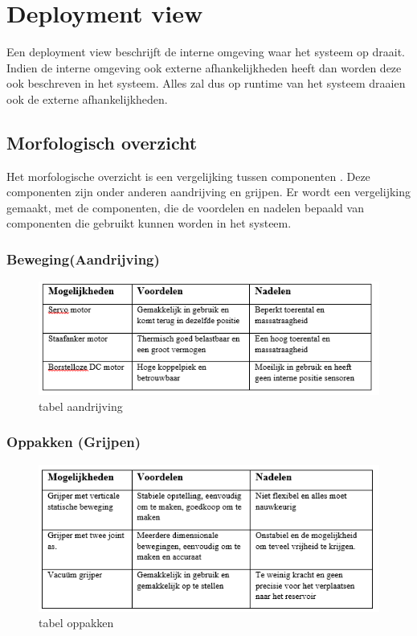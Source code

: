 \documentclass[12pt]{article} %
\begin{document}
\newpage%
\section{Deployment view}
\label{sec:Deployment view}
Een deployment view beschrijft de interne omgeving waar het systeem op draait. Indien de interne omgeving ook externe afhankelijkheden heeft dan worden deze ook beschreven in het systeem. Alles zal dus op runtime van het systeem draaien ook de externe afhankelijkheden.

\subsection{Morfologisch overzicht}
Het morfologische overzicht is een vergelijking tussen componenten . Deze componenten zijn onder anderen aandrijving en grijpen. Er wordt een vergelijking gemaakt, met de componenten, die de voordelen en nadelen bepaald van componenten die gebruikt kunnen worden in het systeem.

\subsubsection{Beweging(Aandrijving)}
\begin{center}
\begin{figure}[h]
\includegraphics[scale=1.]{tabelAand.png}
\caption{tabel aandrijving}
\label{fig:deployment}
\end{figure}
\end{center}
\clearpage

\subsubsection{Oppakken (Grijpen)}
\begin{center}
\begin{figure}[h]
\includegraphics[scale=1.]{tabelOppakken.png}
\caption{tabel oppakken}
\label{fig:deployment}
\end{figure}
\end{center}
\end{document}
